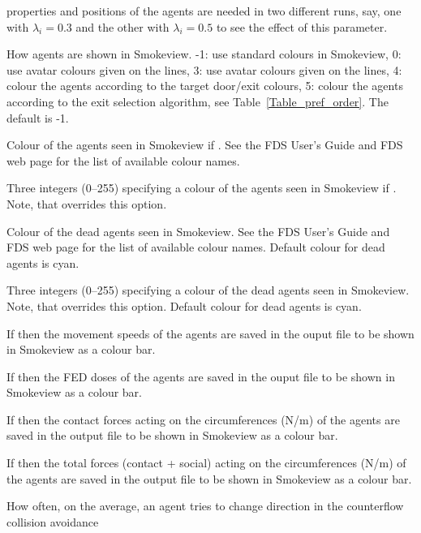 \documentclass[12pt,a4paper,final,twoside]{stylevk}
\begin{document}
\begin{description}
  properties and positions of the agents are needed in two different
  runs, say, one with $\lambda_i=0.3$ and the other with
  $\lambda_i=0.5$ to see the effect of this parameter.
%
\item[\Timts{COLOR\_METHOD}] How agents are shown in Smokeview. -1:
  use standard colours in Smokeview, 0: use avatar colours given on
  the  lines, 3: use avatar colours given on the
   lines, 4: colour the agents according to the target
  door/exit colours, 5: colour the agents according to the exit
  selection algorithm, see Table~\ref{Table_pref_order}.  The default
  is -1.
%
\item[\Timts{AVATAR\_COLOR}] Colour of the agents seen in Smokeview if
  .  See the FDS User's Guide and FDS web page
  for the list of available colour names.
%
\item[\Timts{AVATAR\_RGB}] Three integers (0--255) specifying a colour
  of the agents seen in Smokeview if .  Note,
  that  overrides this option.
%
\item[\Timts{DEAD\_COLOR}] Colour of the dead agents seen in Smokeview.
  See the FDS User's Guide and FDS web page for the list of available
  colour names.  Default colour for dead agents is cyan.
%
\item[\Timts{DEAD\_RGB}] Three integers (0--255) specifying a colour of
  the dead agents seen in Smokeview.  Note, that 
  overrides this option.  Default colour for dead agents is cyan.
%
\item[\Timts{OUTPUT\_SPEED}] If  then the movement
  speeds of the agents are saved in the ouput file to be shown in
  Smokeview as a colour bar.
%
\item[\Timts{OUTPUT\_FED}] If  then the FED doses of the
  agents are saved in the ouput file to be shown in Smokeview as a
  colour bar.
%
\item[\Timts{OUTPUT\_CONTACT\_FORCE}] If  then the
  contact forces acting on the circumferences (N/m) of the agents are
  saved in the output file to be shown in Smokeview as a colour bar.
%
\item[\Timts{OUTPUT\_TOTAL\_FORCE}] If  then the total
  forces (contact + social) acting on the circumferences (N/m) of the
  agents are saved in the output file to be shown in Smokeview as a
  colour bar.
%
\item[\Timts{TAU\_CHANGE\_V0}] How often, on the average, an agent
  tries to change direction in the counterflow collision avoidance

\end{description}
\end{document}
